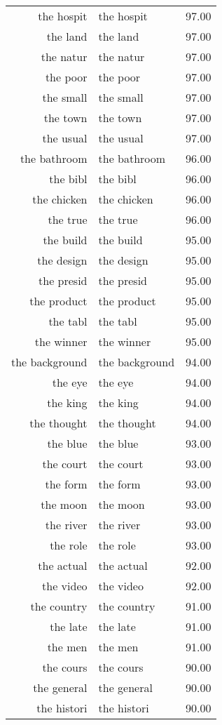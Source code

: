 \begin{table}[ht]
\begin{tabular}{rlr}
  the hospit & the hospit & 97.00 \\ 
  the land & the land & 97.00 \\ 
  the natur & the natur & 97.00 \\ 
  the poor & the poor & 97.00 \\ 
  the small & the small & 97.00 \\ 
  the town & the town & 97.00 \\ 
  the usual & the usual & 97.00 \\ 
  the bathroom & the bathroom & 96.00 \\ 
  the bibl & the bibl & 96.00 \\ 
  the chicken & the chicken & 96.00 \\ 
  the true & the true & 96.00 \\ 
  the build & the build & 95.00 \\ 
  the design & the design & 95.00 \\ 
  the presid & the presid & 95.00 \\ 
  the product & the product & 95.00 \\ 
  the tabl & the tabl & 95.00 \\ 
  the winner & the winner & 95.00 \\ 
  the background & the background & 94.00 \\ 
  the eye & the eye & 94.00 \\ 
  the king & the king & 94.00 \\ 
  the thought & the thought & 94.00 \\ 
  the blue & the blue & 93.00 \\ 
  the court & the court & 93.00 \\ 
  the form & the form & 93.00 \\ 
  the moon & the moon & 93.00 \\ 
  the river & the river & 93.00 \\ 
  the role & the role & 93.00 \\ 
  the actual & the actual & 92.00 \\ 
  the video & the video & 92.00 \\ 
  the country & the country & 91.00 \\ 
  the late & the late & 91.00 \\ 
  the men & the men & 91.00 \\ 
  the cours & the cours & 90.00 \\ 
  the general & the general & 90.00 \\ 
  the histori & the histori & 90.00 \\ 

\end{tabular}
\end{table}
